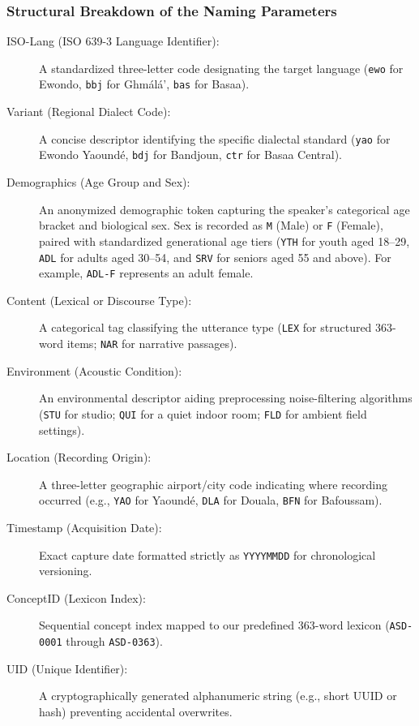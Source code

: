\documentclass[a4paper,11pt]{article}
\begin{document}
\subsubsection*{Structural Breakdown of the Naming Parameters}
\begin{description}
    \item[ISO-Lang (ISO 639-3 Language Identifier):] A standardized three-letter code designating the target language (\texttt{ewo} for Ewondo, \texttt{bbj} for Gh\textopeno m\'al\'a', \texttt{bas} for Basaa).
    \item[Variant (Regional Dialect Code):] A concise descriptor identifying the specific dialectal standard (\texttt{yao} for Ewondo Yaound\'e, \texttt{bdj} for Bandjoun, \texttt{ctr} for Basaa Central).
    \item[Demographics (Age Group and Sex):] An anonymized demographic token capturing the speaker's categorical age bracket and biological sex. Sex is recorded as \texttt{M} (Male) or \texttt{F} (Female), paired with standardized generational age tiers (\texttt{YTH} for youth aged 18--29, \texttt{ADL} for adults aged 30--54, and \texttt{SRV} for seniors aged 55 and above). For example, \texttt{ADL-F} represents an adult female.
    \item[Content (Lexical or Discourse Type):] A categorical tag classifying the utterance type (\texttt{LEX} for structured 363-word items; \texttt{NAR} for narrative passages).
    \item[Environment (Acoustic Condition):] An environmental descriptor aiding preprocessing noise-filtering algorithms (\texttt{STU} for studio; \texttt{QUI} for a quiet indoor room; \texttt{FLD} for ambient field settings).
    \item[Location (Recording Origin):] A three-letter geographic airport/city code indicating where recording occurred (e.g., \texttt{YAO} for Yaound\'e, \texttt{DLA} for Douala, \texttt{BFN} for Bafoussam).
    \item[Timestamp (Acquisition Date):] Exact capture date formatted strictly as \texttt{YYYYMMDD} for chronological versioning.
    \item[ConceptID (Lexicon Index):] Sequential concept index mapped to our predefined 363-word lexicon (\texttt{ASD-0001} through \texttt{ASD-0363}).
    \item[UID (Unique Identifier):] A cryptographically generated alphanumeric string (e.g., short UUID or hash) preventing accidental overwrites.
\end{description}
\end{document}
